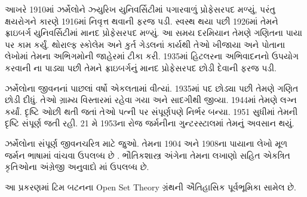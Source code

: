 આખરે 1910માં ઝર્મેલોને
ઝ્યુરિખ યુનિવર્સિટીમાં
પગારવાળું પ્રોફેસરપદ
મળ્યું, પરંતુ ક્ષયરોગને
કારણે 1916માં નિવૃત્ત
થવાની ફરજ પડી.
સ્વસ્થ થયા પછી 1926માં
તેમને ફ્રાઇબર્ગ
યુનિવર્સિટીમાં માનદ
પ્રોફેસરપદ મળ્યું.
આ સમય દરમિયાન તેમણે
ગણિતના પાયા પર કામ
કર્યું. થોરાલ્ફ સ્કોલેમ
અને કુર્ત ગેડલનાં
કાર્યથી તેઓ ખીજાયા
અને પોતાના લેખોમાં
તેમના અભિગમોની
જાહેરમાં ટીકા કરી.
1935માં હિટલરના અભિવાદનનો
ઉપયોગ કરવાની ના પાડ્યા પછી
તેમને ફ્રાઇબર્ગનું માનદ
પ્રોફેસરપદ છોડી દેવાની
ફરજ પડી.
 
ઝર્મેલોના જીવનનાં
પાછલાં વર્ષો એકલતામાં
વીત્યાં. 1935માં પદ
છોડ્યા પછી તેમણે
ગણિત છોડી દીધું.
તેઓ ગ્રામ્ય વિસ્તારમાં
રહેવા ગયા અને સાદગીથી
જીવ્યા. 1944માં તેમણે
લગ્ન કર્યાં. દૃષ્ટિ
ઓછી થતી જતાં તેઓ
પત્ની પર સંપૂર્ણપણે
નિર્ભર બન્યા. 1951
સુધીમાં તેમની દૃષ્ટિ
સંપૂર્ણ જતી રહી.
21 મે 1953ના રોજ
જર્મનીના ગુન્ટરસ્ટાલમાં
તેમનું અવસાન થયું.


\begin{reading}
ઝર્મેલોના સંપૂર્ણ
જીવનચરિત્ર માટે
\citet{Ebbinghaus2015}
જુઓ. તેમના 1904
અને 1908ના પાયાના
લેખો મૂળ જર્મન
ભાષામાં વાંચવા
ઉપલબ્ધ છે
\citep{Zermelo1904,Zermelo1908}.
ભૌતિકશાસ્ત્ર અંગેના
તેમના લખાણો સહિત
એકત્રિત કૃતિઓના
અંગ્રેજી અનુવાદો
\citep{Ebbinghaus2010,Ebbinghaus2013}માં
ઉપલબ્ધ છે.
\end{reading}
\endgroup


\OLEndChapterHook
\endgroup


\begingroup
\makeatletter{}\makeatother

\label{guunit:OLP-0633}


\begin{editorial}
આ પ્રકરણમાં ટિમ બટનના Open Set Theory
ગ્રંથની ઐતિહાસિક પૂર્વભૂમિકા સામેલ છે.
\end{editorial}

\begingroup
\makeatletter{}\makeatother

\label{guunit:OLP-0634}


